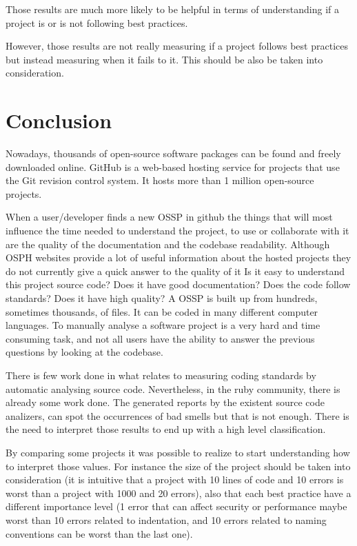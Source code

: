 \documentclass[sle]{llncs}
\begin{document}
Those results are much more likely to be helpful in terms of understanding if a project is or is not following best practices.

However, those results are not really measuring if a project follows best practices but instead measuring when it fails to it.
This should be also be taken into consideration. 




\section{Conclusion}
Nowadays, thousands of open-source software packages can be found and freely downloaded online.
GitHub is a web-based hosting service for projects that use the Git revision control system.
It hosts more than 1 million open-source projects.

When a user/developer finds a new OSSP in github 
the things that will most influence the time needed to understand the project, to use or collaborate with it
are the quality of the documentation and the codebase readability.  
Although OSPH websites provide a lot of useful information about the hosted projects
they do not currently give a quick answer to the quality of it
Is it easy to understand this project source code? Does it have good documentation? Does the code follow standards? 
Does it have high quality?
A OSSP is built up from hundreds, sometimes thousands, of files. It can be coded in many different computer languages.
To manually analyse a software project is a very hard and time consuming task, and not all users have the ability to answer the previous questions by looking at the codebase. 

There is few work done in what relates to measuring coding standards by automatic analysing source code.
Nevertheless, in the ruby community, there is already some work done.
The generated reports by the existent source code analizers, 
can spot the occurrences of bad smells but that is not enough.
There is the need to interpret those results to end up with a high level classification.

By comparing some projects it was possible to realize to start understanding how to interpret those values.
For instance the size of the project should be taken into consideration 
(it is intuitive that a project with 10 lines of code and 10 errors is worst than a project with 1000 and 20 errors), 
also that each best practice have a different importance level
(1 error that can affect security or performance maybe worst than 10 errors related to indentation, and 10 errors related to naming conventions can be worst than the last one).
\end{document}
